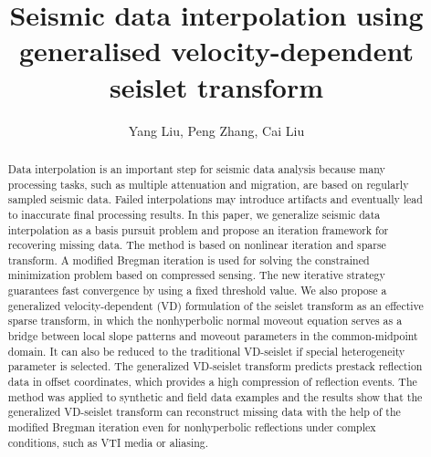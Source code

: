 
\title{Seismic data interpolation using generalised velocity-dependent seislet transform}

\renewcommand{\thefootnote}{\fnsymbol{footnote}}


\address{
\footnotemark[1] College of Geo-exploration Science and Technology,\\
Jilin University \\ No.938 Xi minzhu street, \\ Changchun, China,
130026}

\author{Yang Liu\footnotemark[1], Peng Zhang\footnotemark[1], Cai Liu\footnotemark[1]}

\maketitle

\begin{abstract}
Data interpolation is an important step for seismic data analysis
because many processing tasks, such as multiple attenuation and
migration, are based on regularly sampled seismic data. Failed
interpolations may introduce artifacts and eventually lead to
inaccurate final processing results. In this paper, we generalize
seismic data interpolation as a basis pursuit problem and propose an
iteration framework for recovering missing data. The method is based
on nonlinear iteration and sparse transform. A modified Bregman
iteration is used for solving the constrained minimization problem
based on compressed sensing. The new iterative strategy guarantees
fast convergence by using a fixed threshold value. We also propose a
generalized velocity-dependent (VD) formulation of the seislet
transform as an effective sparse transform, in which the nonhyperbolic
normal moveout equation serves as a bridge between local slope
patterns and moveout parameters in the common-midpoint domain. It can
also be reduced to the traditional VD-seislet if special heterogeneity
parameter is selected. The generalized VD-seislet transform predicts
prestack reflection data in offset coordinates, which provides a high
compression of reflection events. The method was applied to synthetic
and field data examples and the results show that the generalized
VD-seislet transform can reconstruct missing data with the help of the
modified Bregman iteration even for nonhyperbolic reflections under
complex conditions, such as VTI media or aliasing.

\end{abstract}

